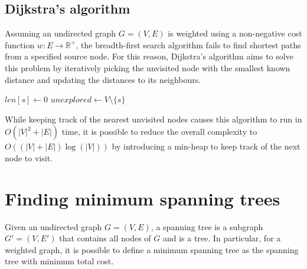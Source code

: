\documentclass{report}
\begin{document}
\subsection{Dijkstra's algorithm}
Assuming an undirected graph $\displaystyle G = (V, E)$ is weighted using a non-negative cost function $\displaystyle w: E \to \mathbb{R}^+$, the breadth-first search algorithm fails to find shortest paths from a specified source node. \newline
For this reason, Dijkstra's algorithm aims to solve this problem by iteratively picking the unvisited node with the smallest known distance and updating the distances to its neighbours.

\begin{algorithm}[H]
    \caption{Dijkstra's algorithm.}

    $\displaystyle len[s] \gets 0$\;
    $\displaystyle unexplored \gets V \setminus \{s\}$\;
\end{algorithm}
\noindent While keeping track of the nearest unvisited nodes causes this algorithm to run in $\displaystyle O(|V|^2 + |E|)$ time, it is possible to reduce the overall complexity to $\displaystyle O((|V| + |E|)\log(|V|))$ by introducing a min-heap to keep track of the next node to visit.
\section{Finding minimum spanning trees}
Given an undirected graph $\displaystyle G = (V, E)$, a spanning tree is a subgraph $\displaystyle G' = (V, E')$ that contains all nodes of $\displaystyle G$ and is a tree. \newline
In particular, for a weighted graph, it is possible to define a minimum spanning tree as the spanning tree with minimum total cost.
\end{document}
